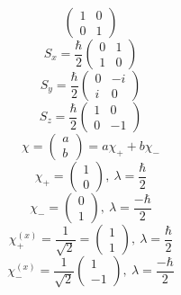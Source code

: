 \documentclass[10pt]{article}
\begin{document}
\begin{multicols}{3}
\begin{equation*}
\begin{pmatrix}
1 & 0 \\ 0 & 1
\end{pmatrix}
\end{equation*}
\begin{equation*}
S_x=\frac{\hbar}{2}
\begin{pmatrix}
0 & 1 \\ 1 & 0
\end{pmatrix}
\end{equation*}
\begin{equation*}
S_y=\frac{\hbar}{2}
\begin{pmatrix}
0 & -i \\ i & 0
\end{pmatrix}
\end{equation*}
\begin{equation*}
S_z=\frac{\hbar}{2}
\begin{pmatrix}
1 & 0 \\ 0 & -1
\end{pmatrix}
\end{equation*}
\begin{equation*}
\chi=
\begin{pmatrix}
a \\ b
\end{pmatrix}
=a\chi_++b\chi_-
\end{equation*}
\begin{equation*}
\chi_+=
\begin{pmatrix}
1 \\ 0
\end{pmatrix}
,\ \lambda=\frac{\hbar}{2}
\end{equation*}
\begin{equation*}
\chi_-=
\begin{pmatrix}
0 \\ 1
\end{pmatrix}
,\ \lambda=\frac{-\hbar}{2}
\end{equation*}
\begin{equation*}
\chi_{+}^{(x)}=\frac{1}{\sqrt{2}}=
\begin{pmatrix}
1 \\ 1
\end{pmatrix}
,\ \lambda=\frac{\hbar}{2}
\end{equation*}
\begin{equation*}
\chi_{-}^{(x)}=\frac{1}{\sqrt{2}}
\begin{pmatrix}
1 \\ -1
\end{pmatrix}
,\ \lambda=\frac{-\hbar}{2}
\end{equation*}

\end{multicols}
\end{document}
